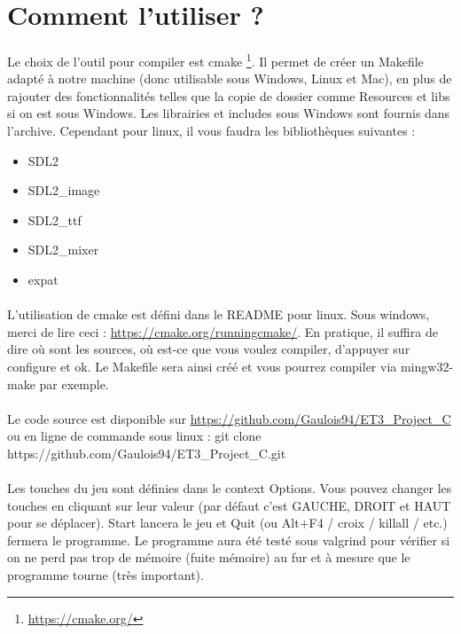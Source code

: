 ﻿\section{Comment l'utiliser ?}

\paragraph{} Le choix de l'outil pour compiler est cmake \footnote{\url{https://cmake.org/}}. Il permet de créer un Makefile adapté à notre machine (donc utilisable sous Windows, Linux et Mac), en plus de rajouter des fonctionnalités telles que la copie de dossier comme Resources et libs si on est sous Windows. Les librairies et includes sous Windows sont fournis dans l'archive. Cependant pour linux, il vous faudra les bibliothèques suivantes :

\begin{itemize}
	\item SDL2
	\item SDL2\_image
	\item SDL2\_ttf
	\item SDL2\_mixer
	\item expat
\end{itemize}

\paragraph{} L'utilisation de cmake est défini dans le README pour linux. Sous windows, merci de lire ceci : \url{https://cmake.org/runningcmake/}. En pratique, il suffira de dire où sont les sources, où est-ce que vous voulez compiler, d'appuyer sur configure et ok. Le Makefile sera ainsi créé et vous pourrez compiler via mingw32-make par exemple.
\paragraph{} Le code source est disponible sur \url{https://github.com/Gaulois94/ET3\_Project\_C} ou en ligne de commande sous linux : git clone https://github.com/Gaulois94/ET3\_Project\_C.git
\paragraph{} Les touches du jeu sont définies dans le context Options. Vous pouvez changer les touches en cliquant sur leur valeur (par défaut c'est GAUCHE, DROIT et HAUT pour se déplacer). Start lancera le jeu et Quit (ou Alt+F4 / croix / killall / etc.) fermera le programme. Le programme aura été testé sous valgrind pour vérifier si on ne perd pas trop de mémoire (fuite mémoire) au fur et à mesure que le programme tourne (très important).
